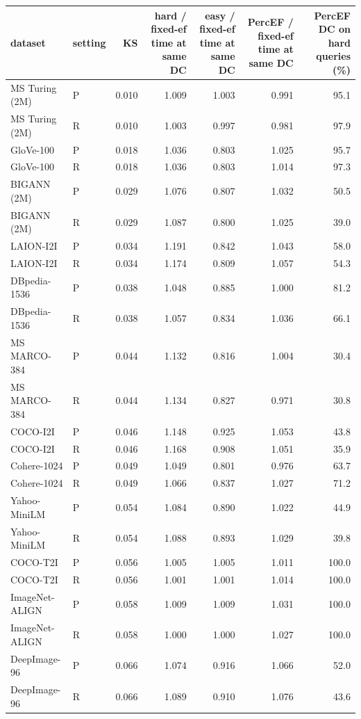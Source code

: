 \begin{tabular}{llrrrrr}
\toprule
dataset & setting & KS & hard / fixed-ef time at same DC & easy / fixed-ef time at same DC & PercEF / fixed-ef time at same DC & PercEF DC on hard queries (\%) \\
\midrule
MS Turing (2M) & P & 0.010 & 1.009 & 1.003 & 0.991 & 95.1 \\
MS Turing (2M) & R & 0.010 & 1.003 & 0.997 & 0.981 & 97.9 \\
GloVe-100 & P & 0.018 & 1.036 & 0.803 & 1.025 & 95.7 \\
GloVe-100 & R & 0.018 & 1.036 & 0.803 & 1.014 & 97.3 \\
BIGANN (2M) & P & 0.029 & 1.076 & 0.807 & 1.032 & 50.5 \\
BIGANN (2M) & R & 0.029 & 1.087 & 0.800 & 1.025 & 39.0 \\
LAION-I2I & P & 0.034 & 1.191 & 0.842 & 1.043 & 58.0 \\
LAION-I2I & R & 0.034 & 1.174 & 0.809 & 1.057 & 54.3 \\
DBpedia-1536 & P & 0.038 & 1.048 & 0.885 & 1.000 & 81.2 \\
DBpedia-1536 & R & 0.038 & 1.057 & 0.834 & 1.036 & 66.1 \\
MS MARCO-384 & P & 0.044 & 1.132 & 0.816 & 1.004 & 30.4 \\
MS MARCO-384 & R & 0.044 & 1.134 & 0.827 & 0.971 & 30.8 \\
COCO-I2I & P & 0.046 & 1.148 & 0.925 & 1.053 & 43.8 \\
COCO-I2I & R & 0.046 & 1.168 & 0.908 & 1.051 & 35.9 \\
Cohere-1024 & P & 0.049 & 1.049 & 0.801 & 0.976 & 63.7 \\
Cohere-1024 & R & 0.049 & 1.066 & 0.837 & 1.027 & 71.2 \\
Yahoo-MiniLM & P & 0.054 & 1.084 & 0.890 & 1.022 & 44.9 \\
Yahoo-MiniLM & R & 0.054 & 1.088 & 0.893 & 1.029 & 39.8 \\
COCO-T2I & P & 0.056 & 1.005 & 1.005 & 1.011 & 100.0 \\
COCO-T2I & R & 0.056 & 1.001 & 1.001 & 1.014 & 100.0 \\
ImageNet-ALIGN & P & 0.058 & 1.009 & 1.009 & 1.031 & 100.0 \\
ImageNet-ALIGN & R & 0.058 & 1.000 & 1.000 & 1.027 & 100.0 \\
DeepImage-96 & P & 0.066 & 1.074 & 0.916 & 1.066 & 52.0 \\
DeepImage-96 & R & 0.066 & 1.089 & 0.910 & 1.076 & 43.6 \\

\end{tabular}
